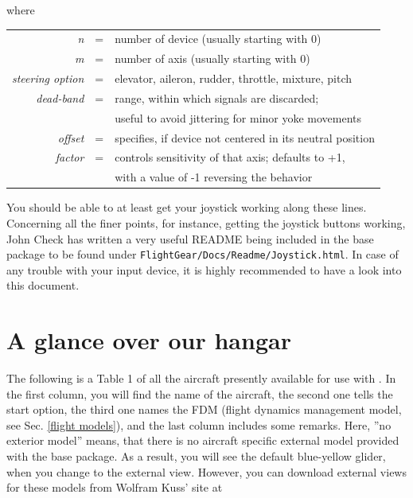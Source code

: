  \noindent
 where
 \medskip

\begin{tabular}{rcl}
 \textit{n} &=& number of device (usually starting with 0)\\
 \textit{m} &=& number of axis (usually starting with 0)\\
 \textit{steering option} &=& elevator, aileron, rudder, throttle, mixture, pitch\\
 \textit{dead-band} &=& range, within which signals are discarded;\\
                   && useful to avoid jittering for minor yoke movements\\
 \textit{offset} &=& specifies, if device not centered in its neutral position\\
  \textit{factor} &=& controls sensitivity of that axis; defaults to +1,\\ 
                 &&with a value of -1 reversing the behavior
  \end{tabular}
 \medskip

You should be able to at least get your joystick working along
these lines. Concerning all the finer points, for instance, getting the joystick buttons
working, John Check has written a very useful README being included in the base package to be found under \texttt{FlightGear/Docs/Readme/Joystick.html}. In case of any trouble with your input device, it is highly recommended to have a look into this document.

\section{A glance over our hangar}\label{hangar}
The following is a Table 1 of all the aircraft presently available for use with \FlightGear{}. In the first column, you will find the name of the aircraft, the second one tells the start option, the third one names the FDM (flight dynamics management model, see Sec. \ref{flight models}), and the last column includes some remarks. Here, ''no exterior model'' means, that there is no aircraft specific external model provided with the base package. As a result, you will see the default blue-yellow glider, when you change to the external view. However, you can download external views for these models from Wolfram Kuss' site at

